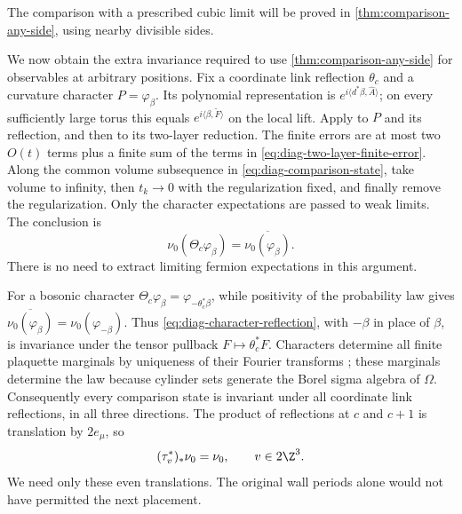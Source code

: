 The comparison with a prescribed cubic limit will be proved in
\cref{thm:comparison-any-side}, using nearby divisible sides.

We now obtain the extra invariance required to use
\cref{thm:comparison-any-side} for observables at arbitrary
positions. Fix a coordinate link reflection $\theta_c$
and a curvature character $P=\varphi_\beta$. Its polynomial
representation is $e^{i\langle d^*\beta,\widehat A\rangle}$;
on every sufficiently large torus this equals
$e^{i\langle\beta,\widetilde F\rangle}$ on the local lift.
Apply  to $P$
and its reflection, and then
 to its two-layer
reduction. The finite errors are at most two $O(t)$ terms
plus a finite sum of the terms in
\eqref{eq:diag-two-layer-finite-error}. Along the common
volume subsequence in \eqref{eq:diag-comparison-state},
take volume to infinity, then $t_k\to0$ with the regularization
fixed, and finally remove the regularization. Only the
character expectations are passed to weak limits. The
conclusion is
\begin{equation}\label{eq:diag-character-reflection}
 \nu_0(\Theta_c\varphi_\beta)
                           =\overline{\nu_0(\varphi_\beta)}.
\end{equation}
There is no need to extract limiting fermion expectations
in this argument.

For a bosonic character
$\Theta_c\varphi_\beta=\varphi_{-\theta_c^*\beta}$, while
positivity of the probability law gives
$\overline{\nu_0(\varphi_\beta)}=\nu_0(\varphi_{-\beta})$.
Thus \eqref{eq:diag-character-reflection}, with $-\beta$
in place of $\beta$, is invariance under the tensor pullback
$F\mapsto\theta_c^*F$. Characters determine all finite
plaquette marginals by uniqueness of their Fourier
transforms \cite[Theorem~6.2]{Potzelberger}; these marginals determine the law because
cylinder sets generate the Borel sigma algebra of $\Omega$.
Consequently every comparison state is invariant under
all coordinate link reflections, in all three directions.
The product of reflections at $c$ and $c+1$ is translation
by $2e_\mu$, so
\begin{equation}\label{eq:diag-even-translation}
 (\tau_v^*)_*\nu_0=\nu_0,\qquad v\in2\Z^3.
\end{equation}
We need only these even translations. The original wall
periods alone would not have permitted the next placement.

